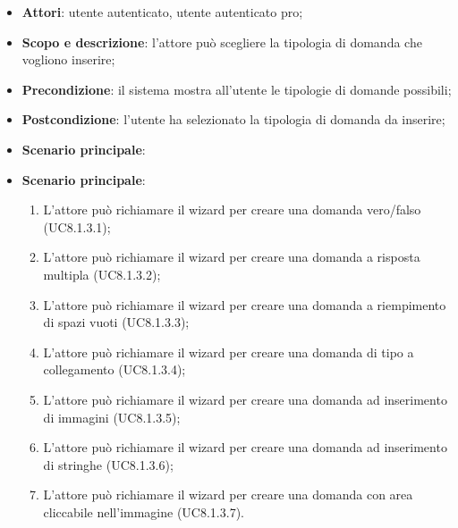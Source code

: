 	\begin{itemize}
		\item
			\textbf{Attori}: utente autenticato, utente autenticato pro;
		\item
			\textbf{Scopo e descrizione}: l'attore può scegliere la tipologia di domanda che vogliono inserire;
		\item		
			\textbf{Precondizione}: il sistema mostra all'utente le tipologie di domande possibili;
		\item
			\textbf{Postcondizione}: l'utente ha selezionato la tipologia di domanda da inserire;
		\item
			\textbf{Scenario principale}:
				\item \textbf{Scenario principale}: 
					\begin{enumerate}
					\item
					L'attore può richiamare il wizard per creare una domanda vero/falso (UC8.1.3.1);
					\item
					L'attore può richiamare il wizard per creare una domanda a risposta multipla (UC8.1.3.2);
					\item
					L'attore può richiamare il wizard per creare una domanda a riempimento di spazi vuoti (UC8.1.3.3);
					\item
					L'attore può richiamare il wizard per creare una domanda di tipo a collegamento (UC8.1.3.4);
					\item
					L'attore può richiamare il wizard per creare una domanda ad inserimento di immagini (UC8.1.3.5);
					\item
					L'attore può richiamare il wizard per creare una domanda ad inserimento di stringhe (UC8.1.3.6);
					\item
					L'attore può richiamare il wizard per creare una domanda con area cliccabile nell'immagine (UC8.1.3.7).
	 			\end{enumerate}
	\end{itemize}










